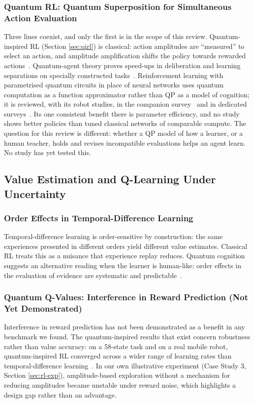 \documentclass[pdflatex,sn-basic]{sn-jnl}
\begin{document}
\subsubsection{Quantum RL: Quantum Superposition for Simultaneous Action Evaluation}
Three lines coexist, and only the first is in the scope of this review. Quantum-inspired RL (Section \ref{sec:qirl}) is classical: action amplitudes are ``measured'' to select an action, and amplitude amplification shifts the policy towards rewarded actions~\citep{Dong2008,Dong2012,Wei2022}. Quantum-agent theory proves speed-ups in deliberation and learning separations on specially constructed tasks~\citep{Dunjko2018}. Reinforcement learning with parametrised quantum circuits in place of neural networks uses quantum computation as a function approximator rather than QP as a model of cognition; it is reviewed, with its robot studies, in the companion survey~\citep{Guru2026} and in dedicated surveys~\citep{Meyer2022,Chen2024}. Its one consistent benefit there is parameter efficiency, and no study shows better policies than tuned classical networks of comparable compute. The question for this review is different: whether a QP model of how a learner, or a human teacher, holds and revises incompatible evaluations helps an agent learn. No study has yet tested this.

\subsection{Value Estimation and Q-Learning Under Uncertainty}\label{sec:value}

\subsubsection{Order Effects in Temporal-Difference Learning}
Temporal-difference learning is order-sensitive by construction: the same experiences presented in different orders yield different value estimates. Classical RL treats this as a nuisance that experience replay reduces. Quantum cognition suggests an alternative reading when the learner is human-like: order effects in the evaluation of evidence are systematic and predictable~\citep{Trueblood2011,Trueblood2017a}.

\subsubsection{Quantum Q-Values: Interference in Reward Prediction (Not Yet Demonstrated)}
Interference in reward prediction has not been demonstrated as a benefit in any benchmark we found. The quantum-inspired results that exist concern robustness rather than value accuracy: on a 58-state task and on a real mobile robot, quantum-inspired RL converged across a wider range of learning rates than temporal-difference learning~\citep{Dong2012}. In our own illustrative experiment (Case Study 3, Section \ref{sec:rl-exp}), amplitude-based exploration without a mechanism for reducing amplitudes became unstable under reward noise, which highlights a design gap rather than an advantage.
\end{document}
